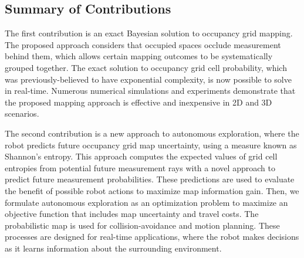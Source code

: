 \subsection{Summary of Contributions}

The first contribution is an exact Bayesian solution to occupancy grid mapping. The proposed approach considers that occupied spaces occlude measurement behind them, which allows certain mapping outcomes to be systematically grouped together. The exact solution to occupancy grid cell probability, which was previously-believed to have exponential complexity, is now possible to solve in real-time. Numerous numerical simulations and experiments demonstrate that the proposed mapping approach is effective and inexpensive in 2D and 3D scenarios.



The second contribution is a new approach to autonomous exploration, where the robot predicts future occupancy grid map uncertainty, using a measure known as Shannon's entropy. This approach computes the expected values of grid cell entropies from potential future measurement rays with a novel approach to predict future measurement probabilities. These predictions are used to evaluate the benefit of possible robot actions to maximize map information gain. Then, we formulate autonomous exploration as an optimization problem to maximize an objective function that includes map uncertainty and travel costs. The probabilistic map is used for collision-avoidance and motion planning. These processes are designed for real-time applications, where the robot makes decisions as it learns information about the surrounding environment.

